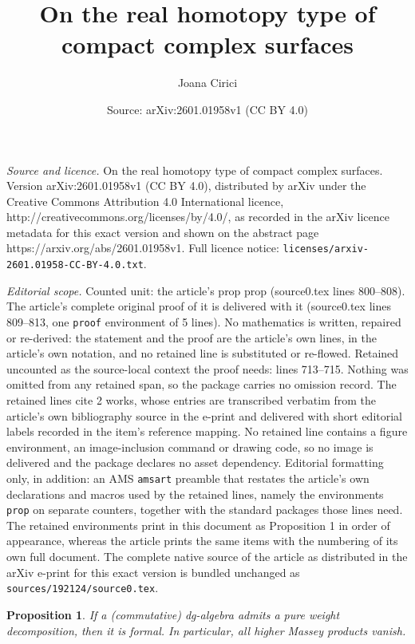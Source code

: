 \documentclass[10pt,a4paper]{amsart}
\title{On the real homotopy type of compact complex surfaces}
\author{Joana Cirici}
\date{Source: arXiv:2601.01958v1 (CC BY 4.0)}
\newtheorem{prop}{Proposition}
\begin{document}
\maketitle

\noindent\emph{Source and licence.} On the real homotopy type of compact complex surfaces. Version arXiv:2601.01958v1 (CC BY 4.0), distributed by arXiv under the Creative Commons Attribution 4.0 International licence, http://creativecommons.org/licenses/by/4.0/, as recorded in the arXiv licence metadata for this exact version and shown on the abstract page https://arxiv.org/abs/2601.01958v1. Full licence notice: \texttt{licenses/arxiv-2601.01958-CC-BY-4.0.txt}.\par\smallskip

\noindent\textit{Editorial scope.} Counted unit: the article's prop prop (source0.tex lines 800--808). The article's complete original proof of it is delivered with it (source0.tex lines 809--813, one \texttt{proof} environment of 5 lines). No mathematics is written, repaired or re-derived: the statement and the proof are the article's own lines, in the article's own notation, and no retained line is substituted or re-flowed.  Retained uncounted as the source-local context the proof needs: lines 713--715.  Nothing was omitted from any retained span, so the package carries no omission record.  The retained lines cite 2 works, whose entries are transcribed verbatim from the article's own bibliography source in the e-print and delivered with short editorial labels recorded in the item's reference mapping.  No retained line contains a figure environment, an image-inclusion command or drawing code, so no image is delivered and the package declares no asset dependency.  Editorial formatting only, in addition: an AMS \texttt{amsart} preamble that restates the article's own declarations and macros used by the retained lines, namely the environments \texttt{prop} on separate counters, together with the standard packages those lines need.  The retained environments print in this document as Proposition 1 in order of appearance, whereas the article prints the same items with the numbering of its own full document.  The complete native source of the article as distributed in the arXiv e-print for this exact version is bundled unchanged as \texttt{sources/192124/source0.tex}.
\begin{prop}\label{formalpure}
 If a (commutative) dg-algebra admits a pure weight decomposition, then it is formal. In particular, all higher Massey products vanish.
\end{prop}
\end{document}
